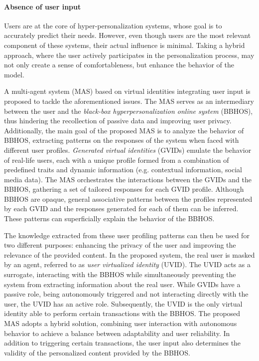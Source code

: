 \paragraph{Absence of user input}
Users are at the core of hyper-personalization systems, whose goal is to accurately predict their needs. However, even though users are the most relevant component of these systems, their actual influence is minimal. Taking a hybrid approach, where the user actively participates in the personalization process, may not only create a sense of comfortableness, but enhance the behavior of the model.

\hfill

A multi-agent system (MAS) based on virtual identities integrating user input is proposed to tackle the aforementioned issues. The MAS serves as an intermediary between the user and the \textit{black-box hyperpersonalization online system} (BBHOS), thus hindering the recollection of passive data and improving user privacy. Additionally, the main goal of the proposed MAS is to analyze the behavior of BBHOS, extracting patterns on the responses of the system when faced with different user profiles. \textit{Generated virtual identities} (GVIDs) emulate the behavior of real-life users, each with a unique profile formed from a combination of predefined traits and dynamic information (e.g. contextual information, social media data). The MAS orchestrates the interactions between the GVIDs and the BBHOS, gathering a set of tailored responses for each GVID profile. Although BBHOS are opaque, general associative patterns between the profiles represented by each GVID and the responses generated for each of them can be inferred. These patterns can superficially explain the behavior of the BBHOS.

The knowledge extracted from these user profiling patterns can then be used for two different purposes: enhancing the privacy of the user and improving the relevance of the provided content. In the proposed system, the real user is masked by an agent, referred to as \textit{user virtualized identity} (UVID). The UVID acts as a surrogate, interacting with the BBHOS while simultaneously preventing the system from extracting information about the real user. While GVIDs have a passive role, being autonomously triggered and not interacting directly with the user, the UVID has an active role. Subsequently, the UVID is the only virtual identity able to perform certain transactions with the BBHOS. The proposed MAS adopts a hybrid solution, combining user interaction with autonomous behavior to achieve a balance between adaptability and user reliability. In addition to triggering certain transactions, the user input also determines the validity of the personalized content provided by the BBHOS.

